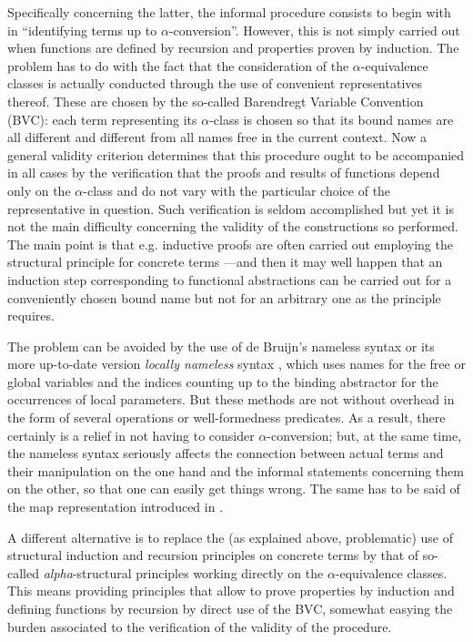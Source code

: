 \documentclass{entcs}
\begin{document}
Specifically concerning the latter, the informal procedure consists to begin with in ``identifying terms up to $\alpha$-conversion''. However, this is not simply carried out when functions are defined by recursion and properties proven by induction. The problem has to do with the fact that the consideration of the $\alpha$-equivalence classes is actually conducted through the use of convenient representatives thereof. These are chosen by the so-called Barendregt Variable Convention (BVC): each term representing its $\alpha$-class is chosen so that its bound names are all different and different from all names free in the current context. Now a general validity criterion determines that this procedure ought to be accompanied in all cases by the verification that the proofs and results of functions depend only on the $\alpha$-class and do not vary with the particular choice of the representative in question. Such verification is seldom accomplished but yet it is not the main difficulty concerning the validity of the constructions so performed. The main point is that e.g. inductive proofs are often carried out employing the structural principle for concrete terms ---and then it may well happen that an induction step corresponding to functional abstractions can be carried out for a conveniently chosen bound name but not for an arbitrary one as the principle requires.

The problem can be avoided by the use of de Bruijn's nameless syntax \cite{deBruijn1972} or its more up-to-date version \textit{locally nameless} syntax \cite{aydemir08,chargueraud12}, which uses names for the free or global variables and the indices counting up to the binding abstractor for the occurrences of local parameters. But these methods are not without overhead in the form of  several operations or well-formedness predicates.
As a result, there certainly is a relief in not having to consider $\alpha$-conversion; but, at the same time, the nameless syntax seriously affects the connection between actual terms and their manipulation on the one hand and the informal statements concerning them on the other, so that one can easily get things wrong. 
The same has to be said of the map representation introduced in \cite{sato}.

A different alternative is to replace the (as explained above, problematic) use of structural induction and recursion principles on concrete terms by that of so-called \emph{alpha}-structural principles working directly on the $\alpha$-equivalence classes. This means providing principles that allow to prove properties by induction and defining functions by recursion by direct use of the BVC, somewhat easying the burden associated to the verification of the validity of the procedure.
\end{document}
